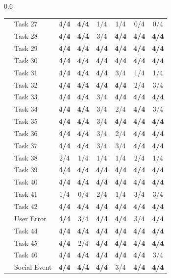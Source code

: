 \begin{table}[t]
\begin{subtable}[t]{0.6\textwidth}
\begin{tabular}{@{}llcccccc@{}}
 & Task 27 & \textbf{4/4} & \textbf{4/4} & 1/4 & 1/4 & 0/4 & 0/4 \\
 & Task 28 & \textbf{4/4} & \textbf{4/4} & 3/4 & \textbf{4/4} & \textbf{4/4} & \textbf{4/4} \\
 & Task 29 & \textbf{4/4} & \textbf{4/4} & \textbf{4/4} & \textbf{4/4} & \textbf{4/4} & \textbf{4/4} \\
 & Task 30 & \textbf{4/4} & \textbf{4/4} & \textbf{4/4} & \textbf{4/4} & \textbf{4/4} & \textbf{4/4} \\
 & Task 31 & \textbf{4/4} & \textbf{4/4} & \textbf{4/4} & 3/4 & 1/4 & 1/4 \\
 & Task 32 & \textbf{4/4} & \textbf{4/4} & \textbf{4/4} & \textbf{4/4} & 2/4 & 3/4 \\
 & Task 33 & \textbf{4/4} & \textbf{4/4} & 3/4 & \textbf{4/4} & \textbf{4/4} & \textbf{4/4} \\
 & Task 34 & \textbf{4/4} & \textbf{4/4} & 3/4 & 2/4 & \textbf{4/4} & 3/4 \\
 & Task 35 & \textbf{4/4} & \textbf{4/4} & 3/4 & \textbf{4/4} & \textbf{4/4} & \textbf{4/4} \\
 & Task 36 & \textbf{4/4} & \textbf{4/4} & 3/4 & 2/4 & \textbf{4/4} & \textbf{4/4} \\
 & Task 37 & \textbf{4/4} & \textbf{4/4} & 3/4 & 3/4 & \textbf{4/4} & \textbf{4/4} \\
 & Task 38 & 2/4 & 1/4 & 1/4 & 1/4 & 2/4 & 1/4 \\
 & Task 39 & \textbf{4/4} & \textbf{4/4} & \textbf{4/4} & \textbf{4/4} & \textbf{4/4} & \textbf{4/4} \\
 & Task 40 & \textbf{4/4} & \textbf{4/4} & \textbf{4/4} & \textbf{4/4} & \textbf{4/4} & \textbf{4/4} \\
 & Task 41 & 1/4 & 0/4 & 2/4 & 1/4 & 3/4 & 3/4 \\
 & Task 42 & \textbf{4/4} & \textbf{4/4} & \textbf{4/4} & \textbf{4/4} & \textbf{4/4} & \textbf{4/4} \\
 & User Error & \textbf{4/4} & 3/4 & \textbf{4/4} & \textbf{4/4} & 3/4 & \textbf{4/4} \\
 & Task 44 & \textbf{4/4} & \textbf{4/4} & \textbf{4/4} & \textbf{4/4} & \textbf{4/4} & \textbf{4/4} \\
 & Task 45 & \textbf{4/4} & 2/4 & \textbf{4/4} & \textbf{4/4} & \textbf{4/4} & \textbf{4/4} \\
 & Task 46 & \textbf{4/4} & \textbf{4/4} & \textbf{4/4} & \textbf{4/4} & \textbf{4/4} & 3/4 \\
 & Social Event & \textbf{4/4} & \textbf{4/4} & \textbf{4/4} & 3/4 & \textbf{4/4} & \textbf{4/4} \\

\end{tabular}
\end{subtable}
\end{table}

